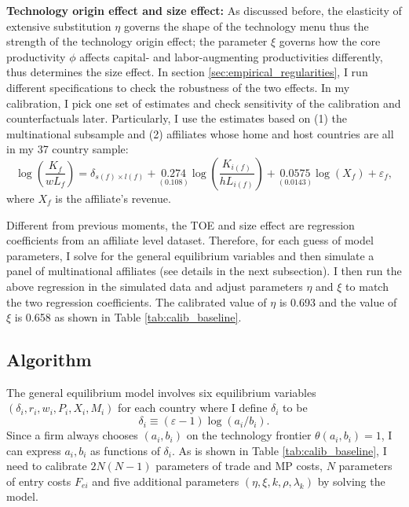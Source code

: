 \documentclass[notitlepage,11pt]{article}%
\begin{document}
\textbf{Technology origin effect and size effect:} As discussed before, the
elasticity of extensive substitution $\eta$ governs the shape of the
technology menu thus the strength of the technology origin effect; the
parameter $\xi$ governs how the core productivity $\phi$ affects capital- and
labor-augmenting productivities differently, thus determines the size effect.
In section \ref{sec:empirical_regularities}, I run different specifications to
check the robustness of the two effects. In my calibration, I pick one set of
estimates and check sensitivity of the calibration and counterfactuals later.
Particularly, I use the estimates based on (1) the multinational subsample and
(2) affiliates whose home and host countries are all in my 37 country sample:%
\begin{equation}
\log\left(  \frac{K_{f}}{wL_{f}}\right)  =\delta_{s\left(  f\right)  \times
l\left(  f\right)  }+\underset{\left(  0.108\right)  }{0.274}\log\left(
\frac{K_{i\left(  f\right)  }}{hL_{i\left(  f\right)  }}\right)
+\underset{\left(  0.0143\right)  }{0.0575}\log\left(  X_{f}\right)
+\varepsilon_{f}, \label{firm_level_reg}%
\end{equation}
where $X_{f}$ is the affiliate's revenue.

Different from previous moments, the TOE and size effect are regression
coefficients from an affiliate level dataset. Therefore, for each guess of
model parameters, I solve for the general equilibrium variables and then
simulate a panel of multinational affiliates (see details in the next
subsection). I then run the above regression in the simulated data and adjust
parameters $\eta$ and $\xi$ to match the two regression coefficients. The
calibrated value of $\eta$ is 0.693 and the value of $\xi$ is 0.658 as shown
in Table \ref{tab:calib_baseline}.%

%


\subsection{Algorithm}

The general equilibrium model involves six equilibrium variables $\left(
\delta_{i},r_{i},w_{i},P_{i},X_{i},M_{i}\right)  $ for each country where I
define $\delta_{i}$ to be%
\[
\delta_{i}\equiv\left(  \varepsilon-1\right)  \log\left(  a_{i}/b_{i}\right)
\text{.}%
\]
Since a firm always chooses $\left(  a_{i},b_{i}\right)  $ on the technology
frontier $\theta\left(  a_{i},b_{i}\right)  =1$, I can express $a_{i},b_{i}$
as functions of $\delta_{i}$. As is shown in Table \ref{tab:calib_baseline}, I
need to calibrate $2N\left(  N-1\right)  $ parameters of trade and MP costs,
$N$ parameters of entry costs $F_{ei}$ and five additional parameters $\left(
\eta,\xi,k,\rho,\lambda_{k}\right)  $ by solving the model.
\end{document}
